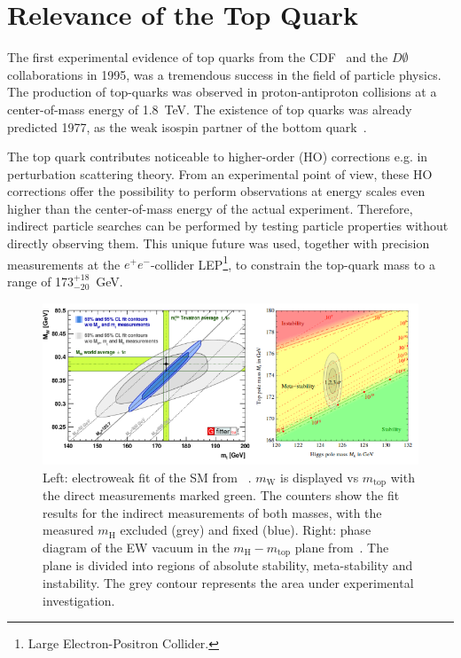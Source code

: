 \section{Relevance of the Top Quark}\label{Relevanz}

The first experimental evidence of top quarks from the CDF~\cite{Abe:1995hr} and the $D \emptyset$~\cite{Abachi:1995iq} collaborations in 1995, was a tremendous success in the field of particle physics. 
The production of top-quarks was observed in proton-antiproton collisions at a center-of-mass energy of 1.8~TeV. The existence of top quarks was already predicted 1977, as the weak isospin partner of the bottom quark~\cite{Herb:1977ek}. 

The top quark contributes noticeable to higher-order (HO) corrections e.g. in perturbation scattering theory.  From an experimental point of view, these HO corrections offer the possibility to perform observations at energy scales even higher than the center-of-mass energy of the actual experiment. Therefore, indirect particle searches can be performed by testing particle properties without directly observing them. This unique future was used, together with precision measurements at the $e^+e^-$-collider LEP\footnote{Large Electron-Positron Collider.}, to constrain the top-quark mass to a range of 173$^{+18}_{-20}$~GeV.~\cite{LEPEW:1994aa}
\begin{figure}[h]
	\centering
	\includegraphics[width=0.9\linewidth]{Pics/Relevanz}
	\caption{Left: electroweak fit of the SM from ~\cite{Baak:2012kk}. $m_{\text{W}}$ is displayed vs $m_{\text{top}}$ with the direct measurements marked green. The  counters show the fit results for the indirect measurements of both masses, with the measured $m_{\text{H}}$ excluded (grey) and fixed (blue).
		Right: phase diagram of the EW vacuum in the $m_{\text{H}}-m_{\text{top}}$ plane from~\cite{Buttazzo:2013uya}. The plane is divided into regions of absolute stability, meta-stability and instability. The grey contour represents the area under experimental investigation.}
	\label{fig:Relevanz}
\end{figure}

